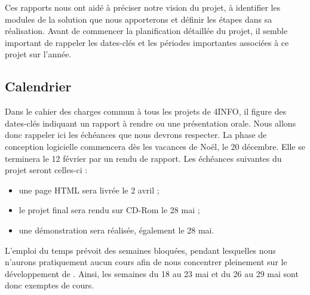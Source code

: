         Ces rapports nous ont aidé à préciser notre vision du projet, à identifier les modules de la solution que nous apporterons et définir les étapes dans sa réalisation. Avant de commencer la planification détaillée du projet, il semble important de rappeler les dates-clés et les périodes importantes associées à ce projet sur l'année.

    \subsection{Calendrier}
        Dans le cahier des charges commun à tous les projets de 4INFO, il figure des dates-clés indiquant un rapport à rendre ou une présentation orale. Nous allons donc rappeler ici les échéances que nous devrons respecter. La phase de conception logicielle commencera dès les vacances de Noël, le 20 décembre. Elle se terminera le 12 février par un rendu de rapport. Les échéances suivantes du projet seront celles-ci :

        \begin{itemize} 
            \item une page HTML sera livrée le 2 avril ; 
            \item le projet final sera rendu sur CD-Rom le 28 mai ; 
            \item une démonstration sera réalisée, également le 28 mai.
        \end{itemize}

        L'emploi du temps prévoit des semaines \og bloquées\fg{}, pendant lesquelles nous n'aurons pratiquement aucun cours afin de nous concentrer pleinement sur le développement de \glasir{}. Ainsi, les semaines du 18 au 23 mai et du 26 au 29 mai sont donc exemptes de cours.